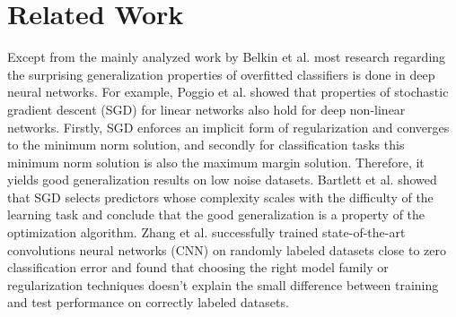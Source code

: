 \section{Related Work}

Except from the mainly analyzed work by Belkin et al. \cite{belkin2018a} most research regarding the surprising generalization properties of overfitted classifiers is done in deep neural networks. For example, Poggio et al. \cite{poggio2018} showed that properties of stochastic gradient descent (SGD) for linear networks also hold for deep non-linear networks. Firstly, SGD enforces an implicit form of regularization and converges to the minimum norm solution, and secondly for classification tasks this minimum norm solution is also the maximum margin solution. Therefore, it yields good generalization results on low noise datasets. Bartlett et al. \cite{bartlett2017} showed that SGD selects predictors whose complexity scales with the difficulty of the learning task and conclude that the good generalization is a property of the optimization algorithm. Zhang et al. \cite{zhang2017} successfully trained state-of-the-art convolutions neural networks (CNN) on randomly labeled datasets close to zero classification error and found that choosing the right model family or regularization techniques doesn't explain the small difference between training and test performance on correctly labeled datasets.
